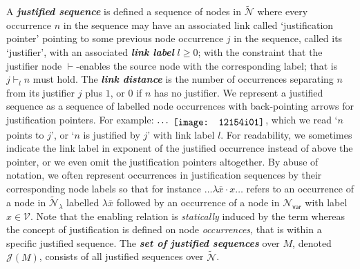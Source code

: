 \documentclass[xchauthor,chkrefs,GCNS,amsmath,amsthm,rotating,leaveRGB]{tcsg}
\renewcommand{\index}[1]{}
\theoremstyle{plain}
\theoremstyle{definition}
\newcommand{\VarSet}{\mathcal{V}}
\newcommand{\Nodes}{\mathcal{N}}
\newcommand{\NodesVar}{\Nodes_{\mathsf{var}}}
\newcommand{\ExtendedNodes}{\tilde{\Nodes}}
\newcommand{\ExtendedNodesLmd}{\tilde{\Nodes}_{\lambda}}
\newcommand{\enables}{\vdash}
\def\justseqset{\mathcal{J}}
\begin{document}
A \textbf{\emph{justified sequence}}\index{justified sequence} is defined a
sequence of nodes in $\ExtendedNodes $ where every occurrence $n$ in the
sequence may have an associated link called `justification pointer' pointing
to some previous node occurrence $j$ in the sequence, called its `justifier',
with an associated \textbf{\emph{link label}}\index{link label} $l\geq 0$;
with the constraint that the justifier node $\enables $-enables the source
node with the corresponding label; that is $j \enables _{l} n$ must hold. The
\textbf{\emph{link distance}}\index{link distance} is the number of
occurrences separating $n$ from its justifier $j$ plus $1$, or $0$ if $n$ has
no justifier. We represent a justified sequence as a sequence of labelled
node occurrences with back-pointing arrows for justification pointers. For
example: $\ldots\ \raisebox{-2pt}{\texttt{[image: 12154i01]}}$, which we read `$n$ points to
$j$', or `$n$ is justified by $j$' with link label $l$. For readability, we
sometimes indicate the link label in exponent of the justified occurrence
instead of above the pointer, or we even omit the justification pointers
altogether. By abuse of notation, we often represent occurrences in
justification sequences by their corresponding node labels so that for
instance $\ldots \lambda \overline{x} \cdot x \ldots $ refers to an
occurrence of a node in $\ExtendedNodesLmd $ labelled $\lambda \overline{x}$
followed by an occurrence of a node in $\NodesVar $ with label $x \in \VarSet
$. Note that the enabling relation is \emph{statically} induced by the term
whereas the concept of justification is defined on node \emph{occurrences},
that is within a specific justified sequence. The \textbf{\emph{set of
justified sequences}}\index{set of justified sequences} over $M$, denoted
$\justseqset (M)$, consists of all justified sequences over $\ExtendedNodes$.
\end{document}
